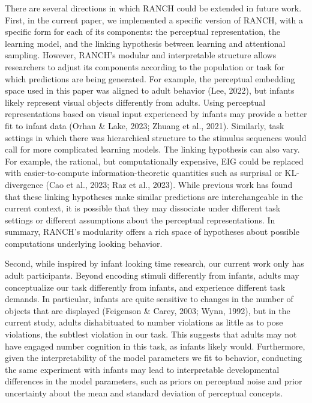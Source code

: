 \documentclass[10pt, letterpaper]{article}
\begin{document}
There are several directions in which RANCH could be extended in future
work. First, in the current paper, we implemented a specific version of
RANCH, with a specific form for each of its components: the perceptual
representation, the learning model, and the linking hypothesis between
learning and attentional sampling. However, RANCH's modular and
interpretable structure allows researchers to adjust its components
according to the population or task for which predictions are being
generated. For example, the perceptual embedding space used in this
paper was aligned to adult behavior (Lee, 2022), but infants likely
represent visual objects differently from adults. Using perceptual
representations based on visual input experienced by infants may provide
a better fit to infant data (Orhan \& Lake, 2023; Zhuang et al., 2021).
Similarly, task settings in which there was hierarchical structure to
the stimulus sequences would call for more complicated learning models.
The linking hypothesis can also vary. For example, the rational, but
computationally expensive, EIG could be replaced with easier-to-compute
information-theoretic quantities such as surprisal or KL-divergence (Cao
et al., 2023; Raz et al., 2023). While previous work has found that
these linking hypotheses make similar predictions are interchangeable in
the current context, it is possible that they may dissociate under
different task settings or different assumptions about the perceptual
representations. In summary, RANCH's modularity offers a rich space of
hypotheses about possible computations underlying looking behavior.

Second, while inspired by infant looking time research, our current work
only has adult participants. Beyond encoding stimuli differently from
infants, adults may conceptualize our task differently from infants, and
experience different task demands. In particular, infants are quite
sensitive to changes in the number of objects that are displayed
(Feigenson \& Carey, 2003; Wynn, 1992), but in the current study, adults
dishabituated to number violations as little as to pose violations, the
subtlest violation in our task. This suggests that adults may not have
engaged number cognition in this task, as infants likely would.
Furthermore, given the interpretability of the model parameters we fit
to behavior, conducting the same experiment with infants may lead to
interpretable developmental differences in the model parameters, such as
priors on perceptual noise and prior uncertainty about the mean and
standard deviation of perceptual concepts.
\end{document}
